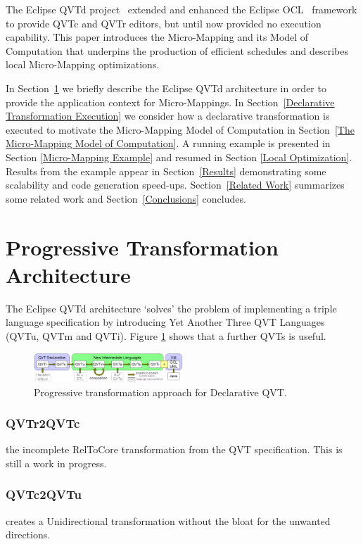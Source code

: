 \documentclass[conference]{IEEEtran}
\begin{document}
The Eclipse QVTd project~\cite{Eclipse-QVTd} extended and enhanced the Eclipse OCL~\cite{Eclipse-OCL} framework to provide QVTc and QVTr editors, but until now provided no execution capability. This paper introduces the Micro-Mapping and its Model of Computation that underpins the production of efficient schedules and describes local Micro-Mapping optimizations.

In Section~\ref{Architecture} we briefly describe the Eclipse QVTd architecture in order to provide the application context for Micro-Mappings. In Section~\ref{Declarative Transformation Execution} we consider how a declarative transformation is executed to motivate the Micro-Mapping Model of Computation in Section~\ref{The Micro-Mapping Model of Computation}. A running example is presented in Section \ref{Micro-Mapping Example} and resumed in Section \ref {Local Optimization}. Results from the example appear in Section~\ref{Results} demonstrating some scalability and code generation speed-ups. Section~\ref{Related Work} summarizes some related work and Section~\ref{Conclusions} concludes.

\section{Progressive Transformation Architecture}\label{Architecture}

The Eclipse QVTd architecture `solves' the problem of implementing a triple language specification by introducing Yet Another Three QVT Languages\cite{ya3qvt} (QVTu, QVTm and QVTi). Figure \ref{fig:architecture} shows that a further QVTs is useful.

\begin{figure}[h]
	\centering
	\includegraphics[width=0.5\textwidth]{QVThorizontalAlphabet.png}
	\caption{Progressive transformation approach for Declarative QVT.}
	\label{fig:architecture}
\end{figure}

\subsubsection{QVTr2QVTc} the incomplete RelToCore transformation from the QVT specification. This is still a work in progress.

\subsubsection{QVTc2QVTu} creates a Unidirectional transformation without the bloat for the unwanted directions.
\end{document}
